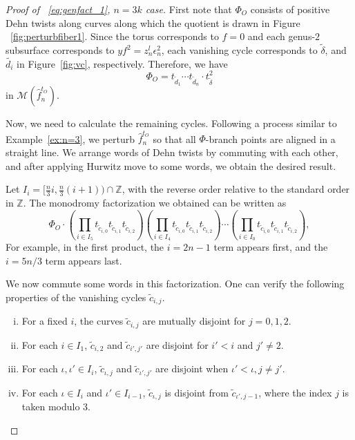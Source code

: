 \documentclass[10pt,a4paper,reqno]{amsart}
\theoremstyle{definition}
\numberwithin{equation}{section}
\numberwithin{figure}{section}
\newcommand{\Z}{\mathbb{Z}}
\newcommand{\ep}{\epsilon}
\begin{document}
\begin{proof}[Proof of ~\eqref{eq:genfact_1}, $n=3k$ case]
First note that $\Phi_O$ consists of positive Dehn twists along curves along which the quotient is drawn in Figure ~\ref{fig:perturbfiber1}.
Since the torus corresponds to $f=0$ and each genus-$2$ subsurface corresponds to $yf^2=z_n^l \ep_n^2$,
each vanishing cycle corresponds to $\tilde{\delta}$, and $\tilde{d_i}$ in Figure~\ref{fig:vc}, respectively.
Therefore, we have
\[\Phi_O=t_{\tilde{d}_1}\cdots t_{\tilde{d}_n} \cdot t_{\tilde{\delta}}^2\]
in $\mathcal{M}(\hat{f}_n^{t_O})$.

Now, we need to calculate the remaining cycles.
Following a process similar to Example~\ref{ex:n=3}, 
we perturb $\hat{f}_n^{t_O}$ so that all $\Phi$-branch points are aligned in a straight line. 
We arrange words of Dehn twists by commuting with each other, and
after applying Hurwitz move to some words, we obtain the desired result.

Let $I_i=[\frac{n}{3} i,\frac{n}{3}(i+1))\cap \Z$, with the reverse order relative to the standard order in $\Z$.
The monodromy factorization we obtained can be written as
\[ \Phi_O \cdot 
\left(\prod_{i\in I_5} t_{\tilde{c}_{i,0}}t_{\tilde{c}_{i,1}}t_{\tilde{c}_{i,2}}\right)
\left(\prod_{i\in I_4} t_{\tilde{c}_{i,0}}t_{\tilde{c}_{i,1}}t_{\tilde{c}_{i,2}}\right)
\cdots
\left(\prod_{i\in I_0} t_{\tilde{c}_{i,0}}t_{\tilde{c}_{i,1}}t_{\tilde{c}_{i,2}}\right),\]
For example, in the first product, the $i=2n-1$ term appears first, and the $i=5n/3$ term appears last.

We now commute some words in this factorization.
One can verify the following properties of the vanishing cycles $\tilde{c}_{i,j}$.

\begin{enumerate}[(i)]
\item For a fixed $i$, the curves $\tilde{c}_{i,j}$ are mutually disjoint for $j=0,1,2$.
\item For each $i\in I_1$, $\tilde{c}_{i,2}$ and $\tilde{c}_{i',j'}$ are disjoint for $i' <i$ and $j'\neq 2$.
\item For each $\iota, \iota' \in I_i$, $\tilde{c}_{\iota,j}$ and $\tilde{c}_{\iota', j'}$ are disjoint when $\iota'<\iota, j\neq j'$.
\item For each $\iota\in I_i$ and $\iota'\in I_{i-1}$, $\tilde{c}_{\iota,j}$ is disjoint from $\tilde{c}_{\iota', j-1}$, where the index $j$ is taken modulo 3.
\end{enumerate}


\end{proof}
\end{document}
